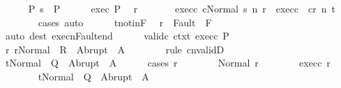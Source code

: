 \begin{isabellebody}
\ \ \ \ \isamarkupfalse%
\ P{\isacharcolon}\ {\isachardoublequoteopen}s\ {\isasymin}\ P{\isachardoublequoteclose}\isanewline
\ \ \ \ \isamarkupfalse%
\ exec\ P\ \isamarkupfalse%
\ r\ \isanewline
\ \ \ \ \ \ exec{\isacharunderscore}c{}{\isacharcolon}\ {\isachardoublequoteopen}{\isasymGamma}{\isasymturnstile}{\isasymlangle}c{}{\isacharcomma}Normal\ s{\isasymrangle}\ {\isacharequal}n{\isasymRightarrow}\ r{\isachardoublequoteclose}\ \ exec{\isacharunderscore}c{}{\isacharcolon}\ \ {\isachardoublequoteopen}{\isasymGamma}{\isasymturnstile}{\isasymlangle}c{}{\isacharcomma}r{\isasymrangle}\ {\isacharequal}n{\isasymRightarrow}\ t{\isachardoublequoteclose}\isanewline
\ \ \ \ \ \ \isamarkupfalse%
\ cases\ auto\isanewline
\ \ \ \ \isamarkupfalse%
\ t{\isacharunderscore}notin{\isacharunderscore}F\ \isamarkupfalse%
\ {\isachardoublequoteopen}r\ {\isasymnotin}\ Fault\ {\isacharbackquote}\ F{\isachardoublequoteclose}\isanewline
\ \ \ \ \ \ \isamarkupfalse%
\ {\isacharparenleft}auto\ dest{\isacharcolon}\ execn{\isacharunderscore}Fault{\isacharunderscore}end{\isacharparenright}\isanewline
\ \ \ \ \isamarkupfalse%
\ valid{\isacharunderscore}c{}\ ctxt\ exec{\isacharunderscore}c{}\ P\isanewline
\ \ \ \ \isamarkupfalse%
\ r{\isacharcolon}\ {\isachardoublequoteopen}r{\isasymin}Normal\ {\isacharbackquote}\ R\ {\isasymunion}\ Abrupt\ {\isacharbackquote}\ A{\isachardoublequoteclose}\isanewline
\ \ \ \ \ \ \isamarkupfalse%
\ {\isacharparenleft}rule\ cnvalidD{\isacharparenright}\isanewline
\ \ \ \ \isamarkupfalse%
\ {\isachardoublequoteopen}t{\isasymin}Normal\ {\isacharbackquote}\ Q\ {\isasymunion}\ Abrupt\ {\isacharbackquote}\ A{\isachardoublequoteclose}\isanewline
\ \ \ \ \isamarkupfalse%
\ {\isacharparenleft}cases\ r{\isacharparenright}\isanewline
\ \ \ \ \ \ \isamarkupfalse%
\ {\isacharparenleft}Normal\ r{\isacharprime}{\isacharparenright}\isanewline
\ \ \ \ \ \ \isamarkupfalse%
\ exec{\isacharunderscore}c{}\ r\isanewline
\ \ \ \ \ \ \isamarkupfalse%
\ {\isachardoublequoteopen}t{\isasymin}Normal\ {\isacharbackquote}\ Q\ {\isasymunion}\ Abrupt\ {\isacharbackquote}\ A{\isachardoublequoteclose}\isanewline
\ \ \ \ \ \ \ \ \isamarkupfalse%
\ {\isacharminus}\isanewline
\ \ \ \ \ \ \ \ \isamarkupfalse%

\end{isabellebody}
